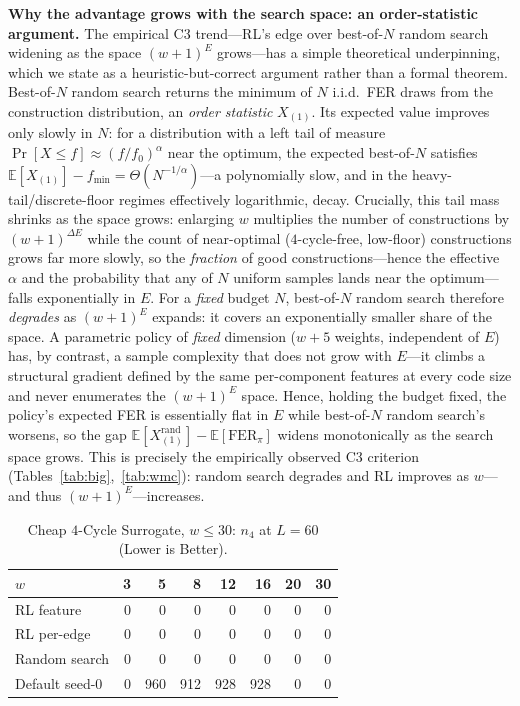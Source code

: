 \documentclass[journal]{IEEEtran}
\begin{document}
\textbf{Why the advantage grows with the search space: an order-statistic
argument.} The empirical C3 trend---RL's edge over best-of-$N$ random search
widening as the space $(w{+}1)^E$ grows---has a simple theoretical underpinning,
which we state as a heuristic-but-correct argument rather than a formal theorem.
Best-of-$N$ random search returns the minimum of $N$ i.i.d.\ FER draws from the
construction distribution, an \emph{order statistic} $X_{(1)}$. Its expected value
improves only slowly in $N$: for a distribution with a left tail of measure
$\Pr[X\le f]\approx (f/f_0)^{\alpha}$ near the optimum, the expected best-of-$N$
satisfies $\mathbb{E}[X_{(1)}]\!-\!f_{\min}=\Theta(N^{-1/\alpha})$---a polynomially
slow, and in the heavy-tail/discrete-floor regimes effectively logarithmic, decay.
Crucially, this tail mass shrinks as the space grows: enlarging $w$ multiplies the
number of constructions by $(w{+}1)^{\Delta E}$ while the count of near-optimal
($4$-cycle-free, low-floor) constructions grows far more slowly, so the
\emph{fraction} of good constructions---hence the effective $\alpha$ and the
probability that any of $N$ uniform samples lands near the optimum---falls
exponentially in $E$. For a \emph{fixed} budget $N$, best-of-$N$ random search
therefore \emph{degrades} as $(w{+}1)^E$ expands: it covers an exponentially
smaller share of the space. A parametric policy of \emph{fixed} dimension
($w{+}5$ weights, independent of $E$) has, by contrast, a sample complexity that
does not grow with $E$---it climbs a structural gradient defined by the same
per-component features at every code size and never enumerates the
$(w{+}1)^E$ space. Hence, holding the budget fixed, the policy's expected FER is
essentially flat in $E$ while best-of-$N$ random search's worsens, so the gap
$\mathbb{E}[X_{(1)}^{\mathrm{rand}}]-\mathbb{E}[\mathrm{FER}_{\pi}]$ widens
monotonically as the search space grows. This is precisely the empirically
observed C3 criterion (Tables~\ref{tab:big},~\ref{tab:wmc}): random search
degrades and RL improves as $w$---and thus $(w{+}1)^E$---increases.

\begin{table}[t]
\centering
\caption{Cheap $4$-Cycle Surrogate, $w\le30$: $n_4$ at $L{=}60$
(Lower is Better).}
\label{tab:wl}
\renewcommand{\arraystretch}{1.2}
\setlength{\tabcolsep}{4pt}
\footnotesize
\begin{tabular}{@{}lrrrrrrr@{}}
\toprule
$w$         & 3 & 5 & 8 & 12 & 16 & 20 & 30\\
\midrule
RL feature  & 0 & 0   & 0   & 0   & 0   & 0 & 0\\
RL per-edge & 0 & 0   & 0   & 0   & 0   & 0 & 0\\
Random search & 0 & 0 & 0   & 0   & 0   & 0 & 0\\
Default seed-0 & 0 & 960 & 912 & 928 & 928 & 0 & 0\\
\bottomrule
\end{tabular}
\end{table}
\end{document}
